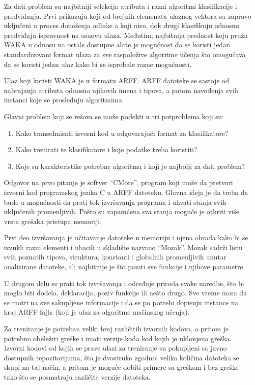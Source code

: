 \documentclass[a4paper]{article}
\begin{document}
Za dati problem su najbitniji selekcija atributa i razni algoritmi klasifikacije i predviđanja.
Prvi prikazuju koji od brojnih elemenata ulaznog vektora su zapravo uključeni u proces donošenja odluke a koji nisu, dok
drugi klasifikuju odnosno predviđaju ispravnost na osnovu ulaza.
Međutim, najbitnija prednost koju pruža WAKA u odnosu na ostale dostupne alate je mogućnost da se koristi
jedan standardizovani format ulaza za sve raspoložive algoritme učenja što omogućava da se koristi jedan ulaz kako bi se isprobale
razne mogućnosti.

Ulaz koji koristi WAKA je u formatu ARFF.
ARFF datoteke se sastoje od nabrajanja atributa odnosno njihovih imena i tipova, a potom navođenja svih instanci koje se prosleđuju algoritmima.

Glavni problem koji se rešava se može podeliti u tri potproblema koji su:
\begin{enumerate}
\item Kako transofmisati izvorni kod u odgovarajući format za klasifikatore?
\item Kako trenirati te klasifikatore i koje podatke treba koristiti?
\item Koje su karakteristike potrebne algoritmu i koji je najbolji za dati problem?
\end{enumerate}



Odgovor na prvo pitanje je softver ``CMore'', program koji može da pretvori izvorni kod programskog
jezika C u ARFF datoteku. Glavna ideja je da treba da bude u mogućnosti da prati tok izvršavanja programa
i uhvati stanja svih uključenih promenljivih. Pošto su zapamćena sva stanja moguće je otkriti više vrsta
grešaka pristupa memoriji.

Prvi deo izvršavanja je učitavanje datoteke u memoriju i njena obrada kako bi se izvukli
razni elementi i ubacili u skladište nazvano ``Mozak''.
Mozak sadrži listu svih poznatih tipova, struktura, konstanti i globalnih promenljivih unutar analizirane datoteke,
ali najbitnije je što pamti sve funkcije i njihove parametre.

U drugom delu se prati tok izvršavanja i određuje
priroda svake naredbe, što bi moglo biti dodela, deklaracija, poziv funkcije ili nešto drugo.
Sve vreme mora da se motri na sve sakupljene informacije i da se po potrebi dopisuju instance na kraj ARFF fajla
(koji je ulaz za algoritme mašinskog učenja).


Za treniranje je potreban veliki broj različitih izvornih kodova, a pritom je potrebno obeležiti greške i imati verzije koda kod kojih je uklonjena greška.
Izvorni kodovi od kojih se prave ulazi za treniranje su pokupljeni sa javno dostupnih repozitorijuma, što je dvostruko zgodno:
velika količina datoteka se skupi na taj način, a pritom je moguće dobiti primere sa greškom i bez greške tako što se posmatraju različite verzije datoteka.
\end{document}
